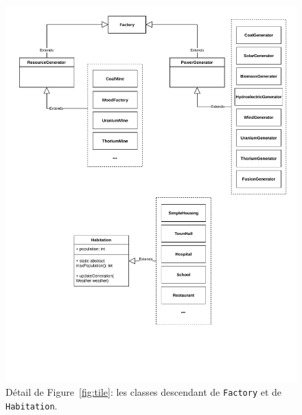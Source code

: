 \documentclass[12pt]{article}
\begin{document}
\begin{figure}[H]
\includegraphics[width=\textwidth]{uml-classes-Page-4}
\caption{Détail de Figure~\ref{fig:tile}: les classes descendant de \texttt{Factory} et de \texttt{Habitation}.\label{fig:factory}}
\end{figure}
\end{document}
